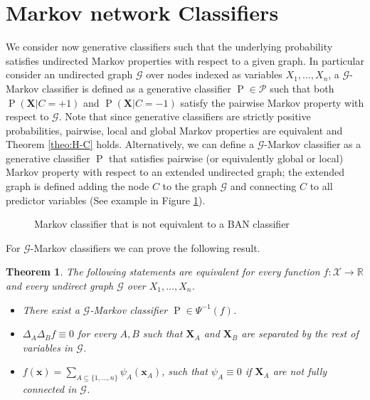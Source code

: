 \documentclass[11pt,a4paper, twoside]{book}
\newtheorem{theorem}{Theorem}[chapter]
\newcommand{\Pp}{\operatorname{P}}
\newcommand{\bx}{\mathbf{x}}
\newcommand{\bX}{\mathbf{X}}
\newcommand{\bchi}{\boldsymbol{\mathcal{X}}}
\begin{document}
\section{Markov network Classifiers}
\label{sec:markov}

We consider now generative classifiers such that the underlying probability satisfies undirected Markov properties with respect to a given graph.
In particular consider an undirected graph $\mathcal{G}$ over nodes indexed as variables $X_1,\ldots,X_n$, a $\mathcal{G}$-Markov classifier is defined as a generative classifier $\operatorname{P} \in \mathcal{P}$ such that both $\Pp(\bX|C=+1)$ and $\Pp(\bX|C=-1)$  satisfy the pairwise Markov property with respect to $\mathcal{G}$.
Note that since generative classifiers are strictly positive probabilities, pairwise, local and global Markov properties are equivalent and Theorem \ref{theo:H-C} holds.
Alternatively, we can define a $\mathcal{G}$-Markov classifier as a generative classifier $\Pp$ that satisfies pairwise (or equivalently global or local) Markov property with respect to an extended undirected graph; the extended graph is defined adding the node $C$ to the graph $\mathcal{G}$ and connecting $C$ to all predictor variables (See example in Figure \ref{fig:markovclass}).

\begin{figure}
\centering
{}
\caption{Markov classifier that is not equivalent to a BAN classifier}
\label{fig:markovclass}
\end{figure}

For $\mathcal{G}$-Markov classifiers we can prove the following result.

\begin{theorem}
\label{theo:discrete}
The following statements are equivalent for every function $f: \bchi \to \mathbb{R}$ and every undirect graph $\mathcal{G}$ over $X_1,\ldots,X_n$.
\begin{itemize}
\item[(i)] There exist a $\mathcal{G}$-Markov classifier $\Pp \in \Psi^{-1}(f)$.
\item[(ii)] $\Delta_A\Delta_Bf\equiv0$ for every $A,B$ such that $\bX_A$ and $\bX_B$ are separated by the rest of variables in $\mathcal{G}$.
\item[(iii)] $f(\bx) = \sum_{A\subseteq\{1,\ldots,n\}} \psi_A(\mathbf{x}_A)$, such that $\psi_A \equiv 0$ if $\bX_A$ are not fully connected in $\mathcal{G}$.
\end{itemize}
\end{theorem}
\end{document}
